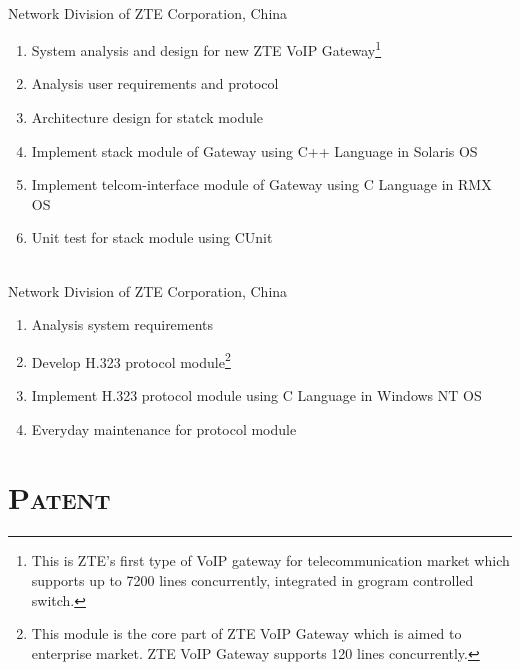 \documentclass[margin,11pt]{res}
\begin{document}
\begin{resume}
     \\
    Network Division of ZTE Corporation, China
     \begin{enumerate}\itemsep -2pt %
     \item System analysis and design for new ZTE VoIP Gateway\footnote{This is ZTE's first type of
         VoIP gateway for telecommunication market which supports up to 7200 lines concurrently,
         integrated in grogram controlled switch. }
     \item Analysis user requirements and protocol
     \item Architecture design for statck module
     \item Implement stack module of Gateway using C++ Language in Solaris OS
     \item Implement telcom-interface module of Gateway using C Language in RMX OS
     \item Unit test for stack module using CUnit
     \end{enumerate} 

     \\
    Network Division of ZTE Corporation, China
     \begin{enumerate}\itemsep -2pt %
     \item Analysis system requirements
     \item Develop H.323 protocol module\footnote{This module
           is the core part of ZTE VoIP Gateway which is aimed to enterprise market. ZTE
           VoIP Gateway supports 120 lines concurrently.}
     \item Implement H.323 protocol module using C Language in Windows NT OS
     \item Everyday maintenance for protocol module
     \end{enumerate} 

\section{{\textsc{Patent}}}


\end{resume}
\end{document}
